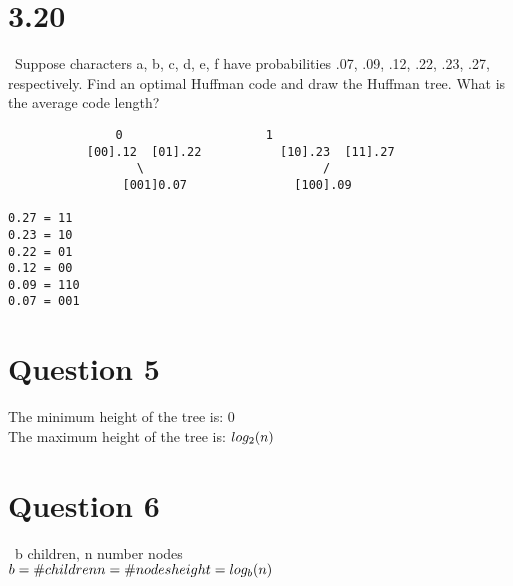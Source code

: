 \documentclass{article}
\begin{document}
\section{3.20}

\ Suppose characters a, b, c, d, e, f have probabilities .07, .09, .12, .22, .23, .27, respectively. 
Find an optimal Huffman code and draw the Huffman tree. 
What is the average code length?

\begin{lstlisting}
		       0					1 
	       [00].12  [01].22		      [10].23  [11].27
	              \		 	      	        /
	    	    [001]0.07	      		[100].09						

0.27 = 11
0.23 = 10
0.22 = 01
0.12 = 00
0.09 = 110
0.07 = 001
\end{lstlisting}

	\section{Question 5}
	
	The minimum height of the tree is: 0 \\
	The maximum height of the tree is: 
	\begin{math}
	log_2(n)\\
	\end{math}

	
	
	\section{Question 6}
	\ b children, n number nodes\\
	\begin{math}
	b=\#children\\
	n=\#nodes\\
	height = log_b(n)	\\
	\end{math}
	 
\end{document}
